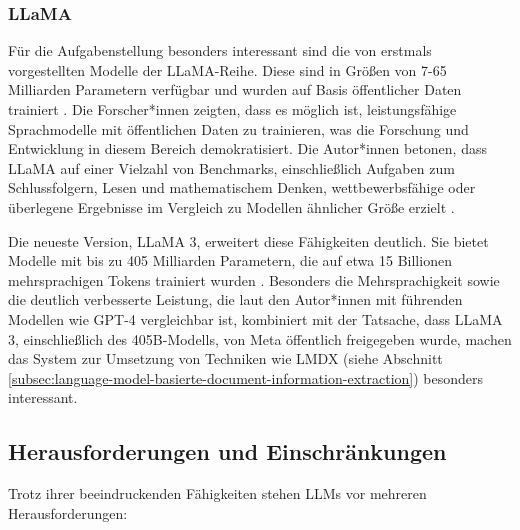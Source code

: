 \subsubsection{LLaMA}
\label{subsubsec:LLaMA}

Für die Aufgabenstellung besonders interessant sind die von \textcite{TouvronHugo2023LOaE} erstmals vorgestellten Modelle der LLaMA-Reihe. Diese sind in Größen von 7-65 Milliarden Parametern verfügbar und wurden auf Basis öffentlicher Daten trainiert \parencite{TouvronHugo2023LOaE}. Die Forscher*innen zeigten, dass es möglich ist, leistungsfähige Sprachmodelle mit öffentlichen Daten zu trainieren, was die Forschung und Entwicklung in diesem Bereich demokratisiert. Die Autor*innen betonen, dass LLaMA auf einer Vielzahl von Benchmarks, einschließlich Aufgaben zum Schlussfolgern, Lesen und mathematischem Denken, wettbewerbsfähige oder überlegene Ergebnisse im Vergleich zu Modellen ähnlicher Größe erzielt \parencite{TouvronHugo2023LOaE}.

Die neueste Version, LLaMA 3, erweitert diese Fähigkeiten deutlich. Sie bietet Modelle mit bis zu 405 Milliarden Parametern, die auf etwa 15 Billionen mehrsprachigen Tokens trainiert wurden \parencite{HartshornAnthony2024TL3H}. Besonders die Mehrsprachigkeit sowie die deutlich verbesserte Leistung, die laut den Autor*innen mit führenden Modellen wie GPT-4 vergleichbar ist, kombiniert mit der Tatsache, dass LLaMA 3, einschließlich des 405B-Modells, von Meta öffentlich freigegeben wurde, machen das System zur Umsetzung von Techniken wie \gls{LMDX} (siehe Abschnitt \ref{subsec:language-model-basierte-document-information-extraction}) besonders interessant.

\subsection{Herausforderungen und Einschränkungen}
\label{subsec:llm-challenges}

Trotz ihrer beeindruckenden Fähigkeiten stehen \glspl{LLM} vor mehreren Herausforderungen:

